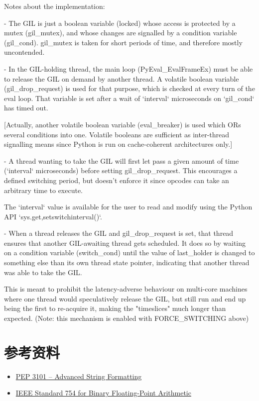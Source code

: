 \begin{definition} \label{def:int}
  Notes about the implementation:

   - The GIL is just a boolean variable (locked) whose access is protected
     by a mutex (gil\_mutex), and whose changes are signalled by a condition
     variable (gil\_cond). gil\_mutex is taken for short periods of time,
     and therefore mostly uncontended.

   - In the GIL-holding thread, the main loop (PyEval\_EvalFrameEx) must be
     able to release the GIL on demand by another thread. A volatile boolean
     variable (gil\_drop\_request) is used for that purpose, which is checked
     at every turn of the eval loop. That variable is set after a wait of
     `interval` microseconds on `gil\_cond` has timed out.

      [Actually, another volatile boolean variable (eval\_breaker) is used
       which ORs several conditions into one. Volatile booleans are
       sufficient as inter-thread signalling means since Python is run
       on cache-coherent architectures only.]

   - A thread wanting to take the GIL will first let pass a given amount of
     time (`interval` microseconds) before setting gil\_drop\_request. This
     encourages a defined switching period, but doesn't enforce it since
     opcodes can take an arbitrary time to execute.

     The `interval` value is available for the user to read and modify
     using the Python API `sys.{get,set}switchinterval()`.

   - When a thread releases the GIL and gil\_drop\_request is set, that thread
     ensures that another GIL-awaiting thread gets scheduled.
     It does so by waiting on a condition variable (switch\_cond) until
     the value of last\_holder is changed to something else than its
     own thread state pointer, indicating that another thread was able to
     take the GIL.

     This is meant to prohibit the latency-adverse behaviour on multi-core
     machines where one thread would speculatively release the GIL, but still
     run and end up being the first to re-acquire it, making the "timeslices"
     much longer than expected.
     (Note: this mechanism is enabled with FORCE\_SWITCHING above)
\end{definition}


\section{参考资料}

\begin{itemize}
\item \href{https://peps.python.org/pep-3101/}{PEP 3101 – Advanced String Formatting}
\item \href{http://li.mit.edu/Archive/Activities/Archive/CourseWork/Ju_Li/MITCourses/18.335/Doc/IEEE754/ieee754.pdf}{IEEE Standard 754 for Binary Floating-Point Arithmetic}
\end{itemize}


